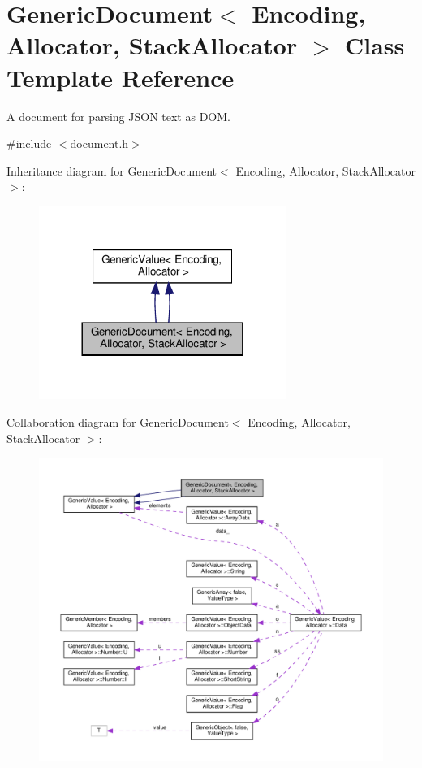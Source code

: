 \hypertarget{classGenericDocument}{}\section{Generic\+Document$<$ Encoding, Allocator, Stack\+Allocator $>$ Class Template Reference}
\label{classGenericDocument}


A document for parsing J\+S\+ON text as D\+OM.  




{\ttfamily \#include $<$document.\+h$>$}



Inheritance diagram for Generic\+Document$<$ Encoding, Allocator, Stack\+Allocator $>$\+:
\nopagebreak
\begin{figure}[H]
\begin{center}
\leavevmode
\includegraphics[width=228pt]{classGenericDocument__inherit__graph}
\end{center}
\end{figure}


Collaboration diagram for Generic\+Document$<$ Encoding, Allocator, Stack\+Allocator $>$\+:
\nopagebreak
\begin{figure}[H]
\begin{center}
\leavevmode
\includegraphics[width=350pt]{classGenericDocument__coll__graph}
\end{center}
\end{figure}
